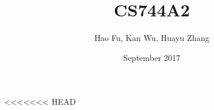 \documentclass{article}
\title{CS744A2}
\author{Hao Fu, Kan Wu, Huayu Zhang}
\date{September 2017}
\begin{document}
\maketitle


<<<<<<< HEAD

\end{document}
